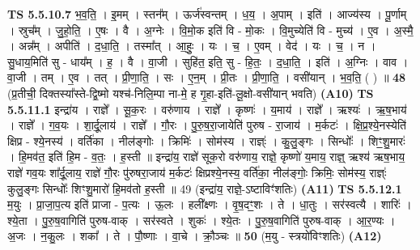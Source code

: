 \documentclass[17pt]{extarticle}
\begin{document}
                                \textbf{ TS 5.5.10.7} \newline
                  भ॒व॒ति॒ । इ॒मम् । स्तन᳚म् । ऊर्ज॑स्वन्तम् । ध॒य॒ । अ॒पाम् । इति॑ । आज्य॑स्य । पू॒र्णाम् । स्रुच᳚म् । जु॒हो॒ति॒ । ए॒षः । वै । अ॒ग्नेः । वि॒मो॒क इति॑ वि - मो॒कः । वि॒मुच्येति॑ वि - मुच्य॑ । ए॒व । अ॒स्मै॒ । अन्न᳚म् । अपीति॑ । द॒धा॒ति॒ । तस्मा᳚त् । आ॒हुः॒ । यः । च॒ । ए॒वम् । वेद॑ । यः । च॒ । न । सु॒धाय॒मिति॑ सु - धाय᳚म् । ह॒ । वै । वा॒जी । सुहि॑त॒ इति॒ सु - हि॒तः॒ । द॒धा॒ति॒ । इति॑ । अ॒ग्निः । वाव । वा॒जी । तम् । ए॒व । तत् । प्री॒णा॒ति॒ । सः । ए॒न॒म् । प्री॒तः । प्री॒णा॒ति॒ । वसी॑यान् । भ॒व॒ति॒ ( ) ॥ \textbf{  48} \newline
                  \newline
                      (प्र॒तीची॒ दिक्तस्या᳚स्ते-द्वि॒ष्मो यश्च॑-निलि॒म्पा ना-मे॒ ह गृ॒हा-इति॑-लू॒क्षो-वसी॑यान् भवति)  \textbf{(A10)} \newline \newline
                                \textbf{ TS 5.5.11.1} \newline
                  इन्द्रा॑य । राज्ञे᳚ । सू॒क॒रः । वरु॑णाय । राज्ञे᳚ । कृष्णः॑ । य॒माय॑ । राज्ञे᳚ । ऋश्यः॑ । ऋ॒ष॒भाय॑ । राज्ञे᳚ । ग॒व॒यः । शा॒र्दू॒लाय॑ । राज्ञे᳚ । गौ॒रः । पु॒रु॒ष॒रा॒जायेति॑ पुरुष - रा॒जाय॑ । म॒र्कटः॑ । क्षि॒प्र॒श्ये॒नस्येति॑ क्षिप्र - श्ये॒नस्य॑ । वर्ति॑का । नील॑ङ्गोः । क्रिमिः॑ । सोम॑स्य । राज्ञ्ः॑ । कु॒लु॒ङ्गः । सिन्धोः᳚ । शिꣳ॒॒शु॒मारः॑ । हि॒मव॑त॒ इति॑ हि॒म - व॒तः॒ । ह॒स्ती ॥ \textbf{ } \newline
                  \newline
                      इन्द्रा॑य॒ राज्ञे॑ सूक॒रो वरु॑णाय॒ राज्ञे॒ कृष्णो॑ य॒माय॒ राज्ञ्॒ ऋश्य॑ ऋष॒भाय॒ राज्ञे॑ गव॒यः शा᳚र्दू॒लाय॒ राज्ञे॑ गौ॒रः पु॑रुषरा॒जाय॑ म॒र्कटः॑ क्षिप्रश्ये॒नस्य॒ वर्ति॑का॒ नील॑ङ्गोः॒ क्रिमिः॒ सोम॑स्य॒ राज्ञ्ः॑ कुलु॒ङ्गः सिन्धोः᳚ शिꣳशु॒मारो॑ हि॒मव॑तो ह॒स्ती ॥ 49 (इन्द्रा॑य॒ राज्ञे॒-ऽष्टाविꣳ॑शतिः)  \textbf{(A11)} \newline \newline
                                \textbf{ TS 5.5.12.1} \newline
                  म॒युः । प्रा॒जा॒प॒त्य इति॑ प्राजा - प॒त्यः । ऊ॒लः । हली᳚क्ष्णः । वृ॒ष॒दꣳ॒॒शः । ते । धा॒तुः । सर॑स्वत्यै । शारिः॑ । श्ये॒ता । पु॒रु॒ष॒वागिति॑ पुरुष-वाक् । सर॑स्वते । शुकः॑ । श्ये॒तः । पु॒रु॒ष॒वागिति॑ पुरुष-वाक् । आ॒र॒ण्यः । अ॒जः । न॒कु॒लः । शका᳚ । ते । पौ॒ष्णाः । वा॒चे । क्रौ॒ञ्चः ॥ \textbf{  50} \newline
                  \newline
                      (म॒यु - स्त्रयो॑विꣳशतिः)  \textbf{(A12)} \newline \newline
\end{document}
